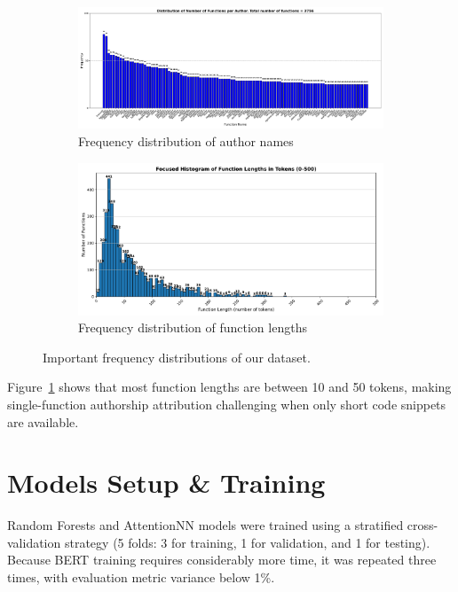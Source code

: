 \documentclass[conference]{IEEEtran}
\begin{document}
\begin{figure}[!t]
    \centering
    \begin{subfigure}{0.48\textwidth}
        \centering
        \includegraphics[width=\linewidth]{figures/distribution_names.pdf}
        \caption{Frequency distribution of author names}
        \label{fig:distr_names}
    \end{subfigure}
    \hfill
    \begin{subfigure}{0.48\textwidth}
        \centering
        \includegraphics[width=\linewidth]{figures/distr_lens_tokens.pdf}
        \caption{Frequency distribution of function lengths}
        \label{fig:disrt_lens}
    \end{subfigure}
    \caption{Important frequency distributions of our dataset.}
    \label{fig:eda_distr}
\end{figure}

Figure~\ref{fig:distr_names} shows that most function lengths are between 10 and 50 tokens, 
making single-function authorship attribution challenging when only short code snippets are available.

\section{Models Setup \& Training}

Random Forests and AttentionNN models were trained using a stratified cross-validation strategy (5 folds: 3 for training,
 1 for validation, and 1 for testing). Because BERT training requires considerably more time, it was repeated three times, with evaluation metric variance below 1\%.
\end{document}

